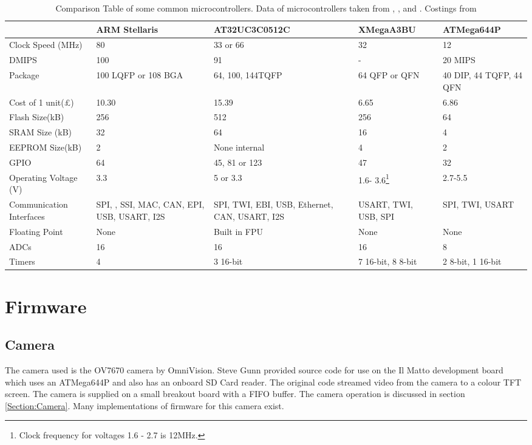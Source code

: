 \begin{table}
\centering
\begin{tabular}{|p{3.5cm}|p{2.4cm}|p{2.9cm}|p{2.3cm}|p{2.4cm}|}\hline
						& 	ARM Stellaris		&	AT32UC3C0512C 		&	XMegaA3BU	&	ATMega644P 	\\	\hline
Clock Speed	(MHz)		&	80					&	33 or 66			&	32			&	12			\\
DMIPS					&	100					&	91					&	-			&	20 MIPS		\\
Package					&	100 LQFP or 108 BGA	&	64, 100, 144TQFP	&	64 QFP or QFN & 40 DIP, 44 TQFP, 44 QFN \\
Cost of 1 unit(\pounds)	&	10.30				& 15.39 &	6.65	 & 6.86\\
Flash Size(kB)			&	256					&	512					&	256			&	64 \\
SRAM Size (kB)			&	32					&	64					&	16			&	4	\\
EEPROM Size(kB)			&	2					&	None internal		&	4			&	2 	\\
GPIO					&	64					& 	45, 81 or 123		&	47			& 	32	\\
Operating Voltage (V)	&	3.3					& 	5	or 3.3			& 	1.6- 3.6\footnote{Clock frequency for voltages 1.6 - 2.7 is 12MHz.}		& 	2.7-5.5	\\
Communication Interfaces &	SPI, \itc, SSI, MAC, CAN, EPI, USB, USART, I2S	& SPI, TWI, EBI, USB, Ethernet, CAN, USART, I2S	&	USART, TWI, USB, SPI 		&	SPI, TWI, USART \\
Floating Point			&	None				&	Built in FPU		&	None		&	None		\\
ADCs					&	16					&	16					&	16			&	8			\\
Timers					&	4					&	3 16-bit			& 7 16-bit, 8 8-bit & 2 8-bit, 1 16-bit \\
\hline
\end{tabular}
\caption{Comparison Table of some common microcontrollers. Data of microcontrollers taken from \cite{Atmel:UC3C}, \cite{Atmel:644P}, \cite{Atmel:A3BU} and \cite{ARM:Stellaris}. Costings from \cite{Farnell}}
\label{tab:uCComp}
\end{table}

\section{Firmware}
\subsection{Camera}

The camera used is the OV7670 camera by OmniVision. Steve Gunn provided source code for use on the Il Matto development board which uses an ATMega644P and also has an onboard SD Card reader. The original code streamed video from the camera to a colour TFT screen. The camera is supplied on a small breakout board with a FIFO buffer. The camera operation is discussed in section \ref{Section:Camera}. Many implementations of firmware for this camera exist.

